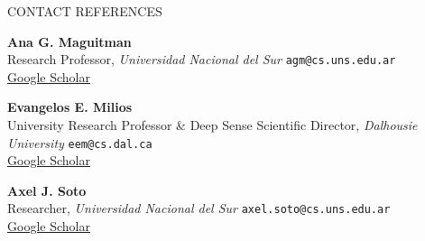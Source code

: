 \documentclass{resume} %
\begin{document}
\newpage
\vspace{0.1cm}
\begin{rSection}{CONTACT REFERENCES}
\vspace{-0.2cm}

\setlength{\itemsep}{0.32em}

% 
\item \textbf{Ana G. Maguitman}\\
Research Professor, \textit{Universidad Nacional del Sur} \hfill \texttt{agm@cs.uns.edu.ar} \\
\href{https://scholar.google.com.ar/citations?user=upxByNEAAAAJ&hl=en&oi=ao}{Google Scholar}

\item \textbf{Evangelos E. Milios}\\
University Research Professor \& Deep Sense Scientific Director, \textit{Dalhousie University} \hfill \texttt{eem@cs.dal.ca}\\
\href{https://scholar.google.com.ar/citations?user=ME8aQywAAAAJ&hl=en&oi=ao}{Google Scholar}

\item \textbf{Axel J. Soto}\\
Researcher, \textit{Universidad Nacional del Sur} \hfill \texttt{axel.soto@cs.uns.edu.ar}\\
\href{https://scholar.google.com.ar/citations?user=AlwbL8IAAAAJ&hl=en&oi=ao}{Google Scholar}
\end{rSection}



\end{document}
